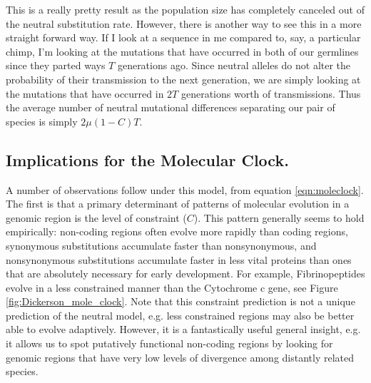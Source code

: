 This is a really pretty result as the population size has completely canceled
out of the neutral substitution rate. However, there is another way to see this
in a more straight forward way. If I look at a sequence in me compared to, say, a
particular chimp, I'm looking at the mutations that have occurred in both of
our germlines since they parted ways $T$ generations ago. Since neutral alleles
do not alter the probability of their transmission to the next generation, we
are simply looking at the mutations that have occurred in $2T$ generations
worth of transmissions. Thus the average number of neutral mutational
differences separating our pair of species is simply $2\mu (1-C) T$.\\

\subsection{Implications for the Molecular Clock.}
A number of observations follow under this model, from equation
\eqref{eqn:moleclock}. The first is that a primary determinant of
patterns of molecular evolution in a genomic region is the level of
constraint ($C$). This pattern generally seems to hold empirically:
non-coding regions often evolve more rapidly than coding regions,
synonymous substitutions accumulate faster than nonsynonymous, and
nonsynonymous substitutions accumulate faster in less vital proteins
than ones that are absolutely necessary for early development. For
example, Fibrinopeptides evolve in a less constrained manner than the
Cytochrome c gene, see Figure \ref{fig:Dickerson_mole_clock}. Note
that this constraint prediction is not a unique prediction of the neutral model, e.g. less constrained regions may also be better able to evolve adaptively. However, it is a fantastically useful general insight, e.g. it allows us to spot putatively functional non-coding regions by looking for genomic regions that have very low levels of divergence among distantly related species.
